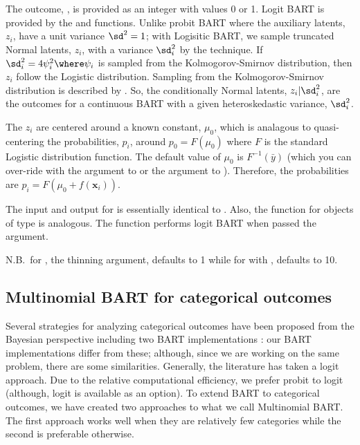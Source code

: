 \documentclass[article]{jss}
\begin{document}
The outcome, , is provided as an integer with values 0
or 1.  Logit BART is provided by the  and 
functions.  Unlike probit BART where the auxiliary latents, $z_i$,
have a unit variance $\sd^2=1$; with Logisitic BART, we sample
truncated Normal latents, $z_i$, with a variance $\sd_i^2$ by the
\citet{Robe95} technique.  If ${\sd^2_i} = 4\psi_i^2 \where \psi_i$ is
sampled from the Kolmogorov-Smirnov distribution, then $z_i$ follow
the Logistic distribution.  Sampling from the Kolmogorov-Smirnov
distribution is described by \cite{Devr86}.  So, the conditionally
Normal latents, $z_i|\sd_i^2$, are the outcomes for a continuous BART
with a given heteroskedastic variance, $\sd_i^2$.  %

The $z_i$ are centered around a known constant, $\mu_0$, which is
analagous to quasi-centering the probabilities, $p_i$, around
$p_0=F(\mu_0)$ where $F$ is the standard Logistic distribution
function.  The default value of $\mu_0$ is $F^{-1}(\bar{y})$ (which
you can over-ride with the  argument to
 or the  argument to ).
Therefore, the probabilities are $p_i=F(\mu_0+f(\bm{x}_i))$.

The input and output for  is essentially identical to
.  Also, the  function for objects of type
 is analogous.  The  function performs logit
BART when passed the  argument.  

N.B.\ for
, the thinning argument,  defaults to 1
while for  with , 
defaults to 10.

\subsection{Multinomial BART for categorical outcomes}

Several strategies for analyzing categorical outcomes have been
proposed from the Bayesian perspective
\citep{AlbeChib93,McCuRoss94,McCuPols00,ImaiVanD05,FruhFruh10,Scot11}
including two BART implementations \citep{KindWang16,Murr17}: our BART
implementations differ from these; although, since we are working on
the same problem, there are some similarities.
Generally, the literature has taken a logit approach.  Due to
the relative computational efficiency, we prefer probit to logit
(although, logit is available as an option).  To extend BART to
categorical outcomes, we have created two approaches to what we call
Multinomial BART.  The first approach works well when they are
relatively few categories while the second is preferable otherwise.
\end{document}
